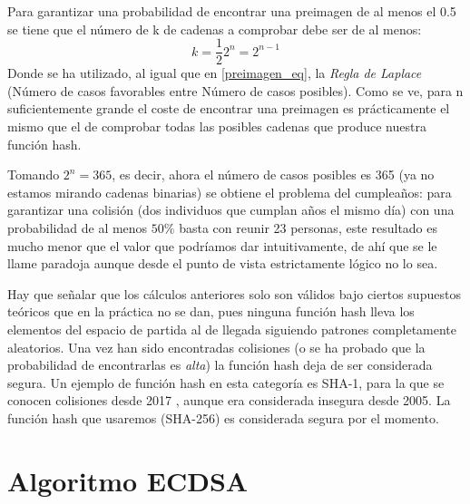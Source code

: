 Para garantizar una probabilidad de encontrar una preimagen de al menos el 0.5 se tiene que el número de k de cadenas a comprobar debe ser de al menos:
\begin{equation}
k=\frac{1}{2}2^{n} = 2^{n-1}
\end{equation}
Donde se ha utilizado, al igual que en \ref{preimagen_eq}, la \textit{Regla de Laplace} (Número de casos favorables entre Número de casos posibles).  Como se ve, para n suficientemente grande el coste de encontrar una preimagen es prácticamente el mismo que el de comprobar todas las posibles cadenas que produce nuestra función hash.

Tomando $2^{n} = 365$, es decir, ahora el número de casos posibles es 365 (ya no estamos mirando cadenas binarias) se obtiene el problema del cumpleaños: para garantizar una colisión (dos individuos que cumplan años el mismo día) con una probabilidad de al menos $50\%$ basta con reunir 23 personas, este resultado es mucho menor que el valor que podríamos dar intuitivamente, de ahí que se le llame paradoja aunque desde el punto de vista estrictamente lógico no lo sea.


Hay que señalar que los cálculos anteriores solo son válidos bajo ciertos supuestos teóricos que en la práctica no se dan, pues ninguna función hash lleva los elementos del espacio de partida al de llegada siguiendo patrones completamente aleatorios. Una vez han sido encontradas colisiones (o se ha probado que la probabilidad de encontrarlas es \textit{alta}) la función hash deja de ser considerada segura. Un ejemplo de función hash en esta categoría es SHA-1, para la que se conocen colisiones desde 2017 \citep{sha-1}, aunque era considerada insegura desde 2005. 
La función hash que usaremos (SHA-256) es considerada segura por el momento.








\section{Algoritmo ECDSA}

